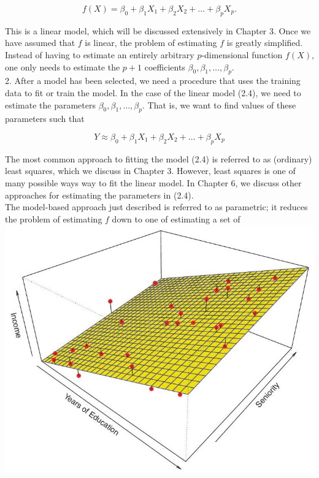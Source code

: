 \documentclass[10pt]{article}
\begin{document}
\begin{equation*}
f(X)=\beta_{0}+\beta_{1} X_{1}+\beta_{2} X_{2}+\ldots+\beta_{p} X_{p} . \tag{2.4}
\end{equation*}


This is a linear model, which will be discussed extensively in Chapter 3. Once we have assumed that $f$ is linear, the problem of estimating $f$ is greatly simplified. Instead of having to estimate an entirely arbitrary $p$-dimensional function $f(X)$, one only needs to estimate the $p+1$ coefficients $\beta_{0}, \beta_{1}, \ldots, \beta_{p}$.\\
2. After a model has been selected, we need a procedure that uses the training data to fit or train the model. In the case of the linear model (2.4), we need to estimate the parameters $\beta_{0}, \beta_{1}, \ldots, \beta_{p}$. That is, we want to find values of these parameters such that

$$
Y \approx \beta_{0}+\beta_{1} X_{1}+\beta_{2} X_{2}+\ldots+\beta_{p} X_{p}
$$

The most common approach to fitting the model (2.4) is referred to as (ordinary) least squares, which we discuss in Chapter 3. However, least squares is one of many possible ways way to fit the linear model. In Chapter 6, we discuss other approaches for estimating the parameters in (2.4).\\
The model-based approach just described is referred to as parametric; it reduces the problem of estimating $f$ down to one of estimating a set of\\
\includegraphics[max width=\textwidth, center]{2025_05_05_efe77898333945044de4g-037}
\end{document}
